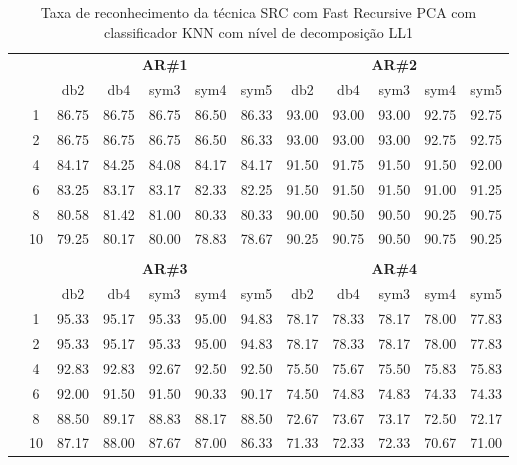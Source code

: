 \begin{table}[htpb]
	\centering
    \normalsize
	\caption{Taxa de reconhecimento da técnica SRC com Fast Recursive PCA com classificador KNN com nível de decomposição LL1}
	\begin{tabular}{|c|c|c c c c c|c c c c c|}
\cline{3-12}
\multicolumn{2}{c|}{\multirow{2}{*}{}} & \multicolumn{5}{c|}{\textbf{AR\#1}}  & \multicolumn{5}{c|}{\textbf{AR\#2}} \\\cline{3-12}

\multicolumn{2}{c|}{}  & db2 & db4 & sym3 & sym4 & sym5 & db2 & db4& sym3 & sym4 & sym5 \\\hline

\multicolumn{1}{|c|}{ \multirow{5}{*}{\rotatebox[origin=c]{90}{\textbf{K-vizinhos}}} }
&1	&86.75&	86.75&	86.75&	86.50&	86.33&	93.00&	93.00&	93.00&	92.75&	92.75	\\\cline{2-12}
&2	&86.75&	86.75&	86.75&	86.50&	86.33&	93.00&	93.00&	93.00&	92.75&	92.75	\\\cline{2-12}
&4	&84.17&	84.25&	84.08&	84.17&	84.17&	91.50&	91.75&	91.50&	91.50&	92.00	\\\cline{2-12}
&6	&83.25&	83.17&	83.17&	82.33&	82.25&	91.50&	91.50&	91.50&	91.00&	91.25	\\\cline{2-12}
&8	&80.58&	81.42&	81.00&	80.33&	80.33&	90.00&	90.50&	90.50&	90.25&	90.75	\\\cline{2-12}
&10	&79.25&	80.17&	80.00&	78.83&	78.67&	90.25&	90.75&	90.50&	90.75&	90.25	


	
\\ \midrule
\multicolumn{12}{c}{}\\ 

\cline{3-12}
\multicolumn{2}{c}{} & \multicolumn{5}{|c|}{\textbf{AR\#3}}  & \multicolumn{5}{c|}{\textbf{AR\#4}} \\\cline{3-12}
\multicolumn{2}{c}{}  & \multicolumn{1}{|c}{db2} & db4 & sym3 & sym4 & sym5 & db2 & db4& sym3 & sym4 & sym5 \\\hline
\multicolumn{1}{|c|}{ \multirow{6}{*}{\rotatebox[origin=c]{90}{\textbf{K-vizinhos}}} }
&1	&95.33&	95.17&	95.33&	95.00&	94.83&	78.17&	78.33&	78.17&	78.00&	77.83	\\\cline{2-12}
&2	&95.33&	95.17&	95.33&	95.00&	94.83&	78.17&	78.33&	78.17&	78.00&	77.83	\\\cline{2-12}
&4	&92.83&	92.83&	92.67&	92.50&	92.50&	75.50&	75.67&	75.50&	75.83&	75.83	\\\cline{2-12}
&6	&92.00&	91.50&	91.50&	90.33&	90.17&	74.50&	74.83&	74.83&	74.33&	74.33	\\\cline{2-12}
&8	&88.50&	89.17&	88.83&	88.17&	88.50&	72.67&	73.67&	73.17&	72.50&	72.17	\\\cline{2-12}
&10	&87.17&	88.00&	87.67&	87.00&	86.33&	71.33&	72.33&	72.33&	70.67&	71.00	

\\\midrule
\end{tabular}

\end{table}

